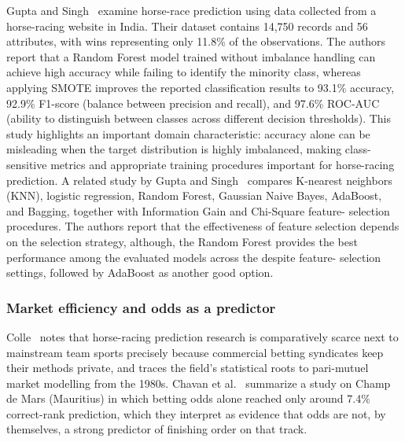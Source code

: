 Gupta and Singh~\cite{ejeA_gupta2023} examine horse-race prediction using data
collected from a horse-racing website in India. Their dataset contains 14,750
records and 56 attributes, with wins representing only 11.8\% of the observations.
The authors report that a Random Forest model trained without imbalance handling
can achieve high accuracy while failing to identify the minority class, whereas
applying SMOTE improves the reported classification results to 93.1\% accuracy,
92.9\% F1-score (balance between precision and recall), and 97.6\% ROC-AUC (ability
to distinguish between classes across different decision thresholds). This study
highlights an important domain characteristic: accuracy alone can be misleading
when the target distribution is highly imbalanced, making class-sensitive metrics
and appropriate training procedures important for horse-racing prediction. A
related study by Gupta and Singh~\cite{ejeA_gupta2024b} compares K-nearest
neighbors (KNN), logistic regression, Random Forest, Gaussian Naive Bayes,
AdaBoost, and Bagging, together with Information Gain and Chi-Square feature-
selection procedures. The authors report that the effectiveness of feature
selection depends on the selection strategy, although, the Random Forest provides
the best performance among the evaluated models across the despite feature-
selection settings, followed by AdaBoost as another good option.

\subsubsection*{\textbf{Market efficiency and odds as a predictor}} Colle~\cite{ejeA_colle_nd}
notes that horse-racing prediction research is comparatively scarce next to
mainstream team sports precisely because commercial betting syndicates keep their
methods private, and traces the field's statistical roots to pari-mutuel market
modelling from the 1980s. Chavan et al.~\cite{ejeC_chavan2024} summarize a study on
Champ de Mars (Mauritius) in which betting odds alone reached only around 7.4\%
correct-rank prediction, which they interpret as evidence that odds are not, by
themselves, a strong predictor of finishing order on that track.

